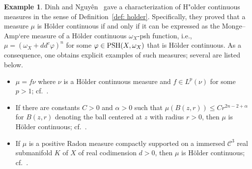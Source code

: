 \documentclass[a4paper,11pt]{amsart}
\numberwithin{equation}{section}
\theoremstyle{definition}
\newtheorem{example}[theorem]{Example}
\newcommand{\ddc}{dd^c}
\newcommand{\PSH}{{\rm PSH}}
\begin{document}
\begin{example}
   Dinh and Nguy\^en~\cite{dinh2014characterization} gave a characterization of H"older continuous measures in the sense of Definition~\ref{def: holder}. Specifically, they proved that a measure $\mu$ is H\"older continuous if and only if it can be expressed as the Monge--Amp`ere measure of a H\"older continuous $\omega_X$-psh function, i.e., $\mu = (\omega_X + \ddc\varphi)^n$ for some $\varphi\in\PSH(X,\omega_X)$ that is H\"older continuous. As a consequence, one obtains explicit examples of such measures; several are listed below.
    \begin{itemize}
        \item $\mu=f\nu$ where $\nu$ is a H\"older continuous measure and $f\in L^p(\nu)$ for some $p>1$; cf.~\cite{kolodziej2008holder,demailly2014holder}. 
        \item If there are constants $C>0$ and $\alpha>0$ such that $\mu(B(z,r))\leq Cr^{2n-2+\alpha}$ for $B(z,r)$ denoting the ball centered at $z$ with radius $r>0$, then $\mu$ is H\"older continuous; cf.~\cite{hiep2010holder,demailly2014holder}.
        \item If $\mu$ is a positive Radon measure compactly supported on a immersed $\mathcal{C}^3$ real submanifold $K$ of $X$ of real codimension $d>0$, then $\mu$ is H\"older continuous; cf.~\cite{Vu2018complex}.
    \end{itemize}
\end{example}
\end{document}
